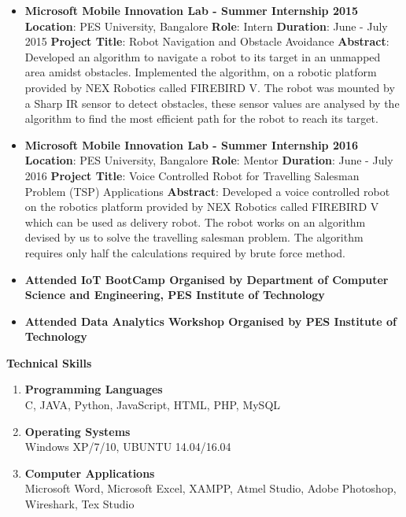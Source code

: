 \documentclass[a4paper,12pt,final]{memoir}
\newcommand{\Sep}{\vspace{1.5em}}
\newcommand{\SmallSep}{\vspace{0.5em}}
\newcommand\tab[1][1cm]{\hspace*{#1}}
\newcommand{\CVSection}[1]
{\Large\textbf{#1}\par
	\SmallSep\normalsize\normalfont}
\newcommand{\CVItem}[1]
{\textbf{\color{RoyalBlue} #1}}
\begin{document}
		\begin{itemize}
			\item \textbf{Microsoft Mobile Innovation Lab - Summer Internship 2015} \newline
			{\footnotesize
				\textbf{Location}: PES University, Bangalore \newline
				\textbf{Role}: Intern \newline
				\textbf{Duration}: June - July 2015 \newline
				\textbf{Project Title}: Robot Navigation and Obstacle Avoidance \newline
				\textbf{Abstract}: Developed an algorithm to navigate a robot to its target in an unmapped area amidst obstacles. Implemented the algorithm, on a robotic platform provided by NEX Robotics called FIREBIRD V. The robot was mounted by a Sharp IR sensor to detect obstacles, these sensor values are analysed by the algorithm to find the most efficient path for the robot to reach its target.
			}
			\item \textbf{Microsoft Mobile Innovation Lab - Summer Internship 2016} \newline
			{\footnotesize
				\textbf{Location}: PES University, Bangalore \newline
				\textbf{Role}: Mentor \newline
				\textbf{Duration}: June - July 2016 \newline
				\textbf{Project Title}: Voice Controlled Robot for Travelling Salesman Problem (TSP) Applications \newline
				\textbf{Abstract}: Developed a voice controlled robot on the robotics platform provided by NEX Robotics called FIREBIRD V which can be used as delivery robot. The robot works on an algorithm devised by us to solve the travelling salesman problem. The algorithm requires only half the calculations required by brute force method.
			}
			\item \textbf{Attended IoT BootCamp Organised by Department of Computer Science and Engineering, PES Institute of Technology} 
			
			\item \textbf{Attended Data Analytics Workshop Organised by PES Institute of Technology}
		\end{itemize}
	\Sep
	
	\CVSection{Technical Skills}
		\begin{enumerate}
			\item \CVItem{Programming Languages} \\
			\tab C, JAVA, Python, JavaScript, HTML, PHP, MySQL
			\item \CVItem{Operating Systems} \\
			\tab Windows XP/7/10, UBUNTU 14.04/16.04
			\item \CVItem{Computer Applications} \\
			\tab Microsoft Word, Microsoft Excel, XAMPP, Atmel Studio, Adobe Photoshop, Wireshark, Tex Studio
		\end{enumerate}
	\Sep
	
\end{document}
